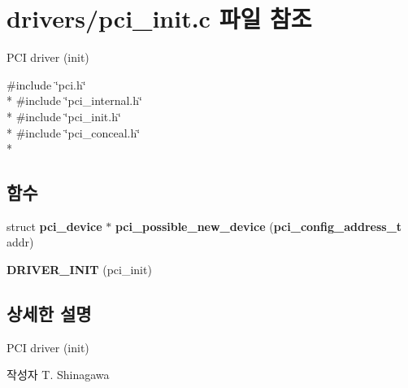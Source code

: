 \section{drivers/pci\-\_\-init.c 파일 참조}
\label{pci__init_8c}


P\-C\-I driver (init)  


{\ttfamily \#include \char`\"{}pci.\-h\char`\"{}}\\*
{\ttfamily \#include \char`\"{}pci\-\_\-internal.\-h\char`\"{}}\\*
{\ttfamily \#include \char`\"{}pci\-\_\-init.\-h\char`\"{}}\\*
{\ttfamily \#include \char`\"{}pci\-\_\-conceal.\-h\char`\"{}}\\*
\subsection*{함수}
\begin{DoxyCompactItemize}
\item 
struct {\bf pci\-\_\-device} $\ast$ {\bfseries pci\-\_\-possible\-\_\-new\-\_\-device} ({\bf pci\-\_\-config\-\_\-address\-\_\-t} addr)\label{pci__init_8c_a665e70cca9e317fdc65692f722758b89}

\item 
{\bfseries D\-R\-I\-V\-E\-R\-\_\-\-I\-N\-I\-T} (pci\-\_\-init)\label{pci__init_8c_adcf8aacfd26e28157747b5aeaf96169e}

\end{DoxyCompactItemize}


\subsection{상세한 설명}
P\-C\-I driver (init) \begin{DoxyAuthor}{작성자}
T. Shinagawa 
\end{DoxyAuthor}
